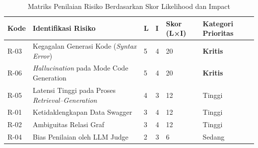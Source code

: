 \begin{table}[H]
\centering
\renewcommand{\arraystretch}{1}
\captionsetup{justification=raggedright,singlelinecheck=false}

\begin{tabular}{|p{1cm}|p{5cm}|p{1cm}|p{1cm}|p{1.5cm}|p{2cm}|}
\hline
\textbf{Kode} &
\textbf{Identifikasi Risiko} &
\textbf{L} &
\textbf{I} &
\textbf{Skor (L×I)} &
\textbf{Kategori Prioritas} \\ \hline

R-03 &
Kegagalan Generasi Kode (\textit{Syntax Error}) &
5 &
4 &
20 &
\textbf{Kritis} \\ \hline

R-06 &
\textit{Hallucination} pada Mode Code Generation &
5 &
4 &
20 &
\textbf{Kritis} \\ \hline

R-05 &
Latensi Tinggi pada Proses \textit{Retrieval--Generation} &
4 &
3 &
12 &
Tinggi \\ \hline

R-01 &
Ketidaklengkapan Data Swagger &
3 &
4 &
12 &
Tinggi \\ \hline

R-02 &
Ambiguitas Relasi Graf &
3 &
4 &
12 &
Tinggi \\ \hline

R-04 &
Bias Penilaian oleh LLM Judge &
2 &
3 &
6 &
Sedang \\ \hline

\end{tabular}
\caption{Matriks Penilaian Risiko Berdasarkan Skor Likelihood dan Impact}
\label{tbl:risk_matrix_score}
\end{table}
